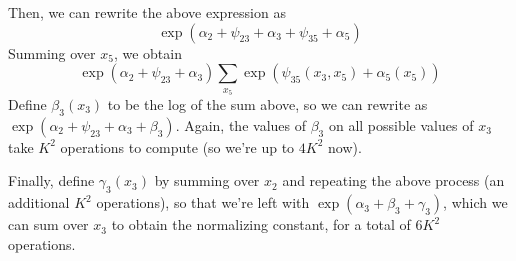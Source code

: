 \documentclass{article}
\begin{document}
Then, we can rewrite the above expression as
\[\exp(\alpha_2+\psi_{23}+\alpha_3+\psi_{35}+\alpha_5)\]
Summing over $x_5$, we obtain
\[\exp(\alpha_2+\psi_{23}+\alpha_3)\sum_{x_5}\exp(\psi_{35}(x_3,x_5)+\alpha_5(x_5))\]
Define $\beta_3(x_3)$ to be the log of the sum above, so we can rewrite as $\exp(\alpha_2+\psi_{23}+\alpha_3+\beta_3)$. Again, the values of $\beta_3$ on all possible values of $x_3$ take $K^2$ operations to compute (so we're up to $4K^2$ now).

Finally, define $\gamma_3(x_3)$ by summing over $x_2$ and repeating the above process (an additional $K^2$ operations), so that we're left with $\exp(\alpha_3+\beta_3+\gamma_3)$, which we can sum over $x_3$ to obtain the normalizing constant, for a total of $6K^2$ operations. 
\end{document}
